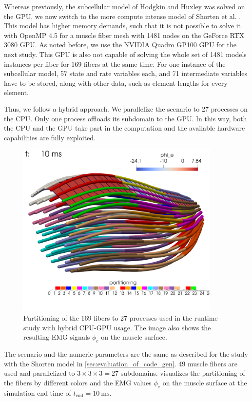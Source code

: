 Whereas previously, the subcellular model of Hodgkin and Huxley was solved on the GPU, we now switch to the more compute intense model of Shorten et al. \cite{Shorten2007}. This model has higher memory demands, such that it is not possible to solve it with OpenMP 4.5 for a muscle fiber mesh with 1481 nodes on the GeForce RTX 3080 GPU. As noted before, we use the NVIDIA Quadro GP100 GPU for the next study.
This GPU is also not capable of solving the whole set of 1481 models instances per fiber for 169 fibers at the same time. For one instance of the subcellular model, 57 state and rate variables each, and 71 intermediate variables have to be stored, along with other data, such as element lengths for every element.

Thus, we follow a hybrid approach. We parallelize the scenario to 27 processes on the CPU. Only one process offloads its subdomain to the GPU. In this way, both the CPU and the GPU take part in the computation and the available hardware capabilities are fully exploited.

\begin{figure}
  \centering%
  \includegraphics[width=0.9\textwidth]{images/results/studies/gpu_parallelization.png}%
  \caption{Partitioning of the 169 fibers to 27 processes used in the runtime study with hybrid CPU-GPU usage. The image also shows the resulting EMG signals $\phi_e$ on the muscle surface.}%
  \label{fig:gpu_parallelization}%
\end{figure}

The scenario and the numeric parameters are the same as described for the study with the Shorten model in \cref{sec:evaluation_of_code_gen}. 49 muscle fibers are used and parallelized to $3\times 3\times 3=27$ subdomains.  visualizes the partitioning of the fibers by different colors and the EMG values $\phi_e$ on the muscle surface at the simulation end time of $t_\text{end}=\SI{10}{\ms}$.

